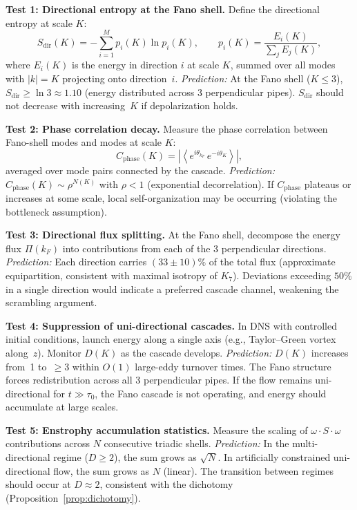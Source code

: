 \documentclass[11pt]{article}
\theoremstyle{definition}
\theoremstyle{remark}
\begin{document}
\medskip\noindent
\textbf{Test 1: Directional entropy at the Fano shell.}
Define the directional entropy at scale $K$:
\[
  S_{\mathrm{dir}}(K) = -\sum_{i=1}^{M}
  p_i(K) \ln p_i(K),
  \qquad
  p_i(K) = \frac{E_i(K)}{\sum_j E_j(K)},
\]
where $E_i(K)$ is the energy in direction $i$ at scale $K$,
summed over all modes with $|k| = K$ projecting onto
direction~$i$.
\emph{Prediction:} At the Fano shell ($K \leq 3$),
$S_{\mathrm{dir}} \geq \ln 3 \approx 1.10$
(energy distributed across 3 perpendicular pipes).
$S_{\mathrm{dir}}$ should not decrease with increasing~$K$
if depolarization holds.

\medskip\noindent
\textbf{Test 2: Phase correlation decay.}
Measure the phase correlation between Fano-shell modes
and modes at scale $K$:
\[
  C_{\mathrm{phase}}(K) =
  \left|\left\langle
    e^{i\theta_{k_F}} \, e^{-i\theta_K}
  \right\rangle\right|,
\]
averaged over mode pairs connected by the cascade.
\emph{Prediction:}
$C_{\mathrm{phase}}(K) \sim \rho^{N(K)}$
with $\rho < 1$ (exponential decorrelation).
If $C_{\mathrm{phase}}$ plateaus or increases at some scale,
local self-organization may be occurring
(violating the bottleneck assumption).

\medskip\noindent
\textbf{Test 3: Directional flux splitting.}
At the Fano shell, decompose the energy flux
$\Pi(k_F)$ into contributions from each of the
3 perpendicular directions.
\emph{Prediction:} Each direction carries
$(33 \pm 10)\%$ of the total flux (approximate
equipartition, consistent with maximal isotropy of $K_7$).
Deviations exceeding $50\%$ in a single direction
would indicate a preferred cascade channel,
weakening the scrambling argument.

\medskip\noindent
\textbf{Test 4: Suppression of uni-directional cascades.}
In DNS with controlled initial conditions, launch energy
along a single axis (e.g., Taylor--Green vortex along~$z$).
Monitor $D(K)$ as the cascade develops.
\emph{Prediction:} $D(K)$ increases from~1 to~$\geq 3$
within $O(1)$ large-eddy turnover times.
The Fano structure forces redistribution across
all 3 perpendicular pipes. If the flow remains
uni-directional for $t \gg \tau_0$, the Fano
cascade is not operating, and energy should
accumulate at large scales.

\medskip\noindent
\textbf{Test 5: Enstrophy accumulation statistics.}
Measure the scaling of $\omega \cdot S \cdot \omega$
contributions across $N$ consecutive triadic shells.
\emph{Prediction:} In the multi-directional regime
($D \geq 2$), the sum grows as $\sqrt{N}$.
In artificially constrained uni-directional flow,
the sum grows as $N$ (linear).
The transition between regimes should occur at
$D \approx 2$, consistent with the dichotomy
(Proposition~\ref{prop:dichotomy}).
\end{document}
